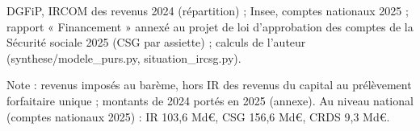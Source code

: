 DGFiP, IRCOM des revenus 2024 (répartition) ; Insee, comptes nationaux 2025 ; rapport « Financement » annexé au projet de loi d'approbation des comptes de la Sécurité sociale 2025 (CSG par assiette) ; calculs de l'auteur (synthese/modele\_purs.py, situation\_ircsg.py).\par Note : revenus imposés au barème, hors IR des revenus du capital au prélèvement forfaitaire unique ; montants de 2024 portés en 2025 (annexe). Au niveau national (comptes nationaux 2025) : IR 103,6 Md\euro{}, CSG 156,6 Md\euro{}, CRDS 9,3 Md\euro{}.

